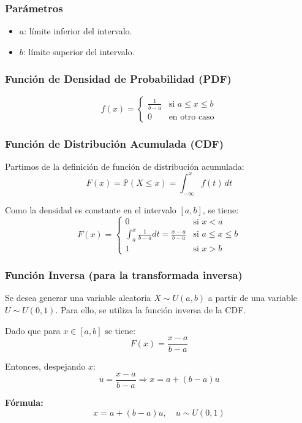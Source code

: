 \documentclass{article}
\begin{document}
\subsubsection*{Parámetros}
\begin{itemize}
  \item $a$: límite inferior del intervalo.
  \item $b$: límite superior del intervalo.
\end{itemize}

\subsubsection*{Función de Densidad de Probabilidad (PDF)}
\[
f(x) =
\begin{cases}
\frac{1}{b - a} & \text{si } a \leq x \leq b \\
0 & \text{en otro caso}
\end{cases}
\]

\subsubsection*{Función de Distribución Acumulada (CDF)}

Partimos de la definición de función de distribución acumulada:
\[
F(x) = \mathbb{P}(X \leq x) = \int_{-\infty}^{x} f(t) \, dt
\]

Como la densidad es constante en el intervalo $[a, b]$, se tiene:
\[
F(x) =
\begin{cases}
0 & \text{si } x < a \\[0.5em]
\int_a^x \frac{1}{b - a} dt = \frac{x - a}{b - a} & \text{si } a \leq x \leq b \\[0.5em]
1 & \text{si } x > b
\end{cases}
\]

\subsubsection*{Función Inversa (para la transformada inversa)}

Se desea generar una variable aleatoria $X \sim U(a,b)$ a partir de una variable $U \sim U(0,1)$. Para ello, se utiliza la función inversa de la CDF.

Dado que para $x \in [a,b]$ se tiene:
\[
F(x) = \frac{x - a}{b - a}
\]

Entonces, despejando $x$:
\[
u = \frac{x - a}{b - a} \Rightarrow x = a + (b - a)u
\]

\textbf{Fórmula:}
\begin{equation}
x = a + (b-a)u, \quad u \sim U(0,1)
\end{equation}
\end{document}
